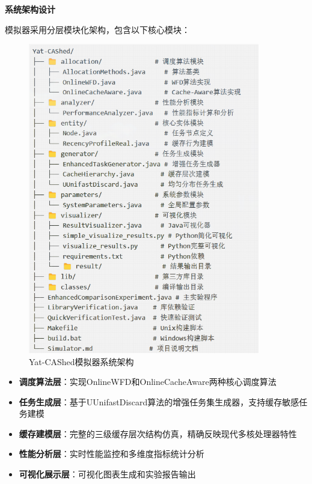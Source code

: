 \textbf{系统架构设计}

模拟器采用分层模块化架构，包含以下核心模块：

\begin{figure}[htbp]
\centering
\includegraphics[width=0.9\textwidth]{img/simulator_structure.png}
\caption{Yat-CAShed模拟器系统架构}
\label{fig:simulator_structure}
\end{figure}

\begin{itemize}
    \item \textbf{调度算法层}：实现OnlineWFD和OnlineCacheAware两种核心调度算法
    \item \textbf{任务生成层}：基于UUnifastDiscard算法的增强任务集生成器，支持缓存敏感任务建模
    \item \textbf{缓存建模层}：完整的三级缓存层次结构仿真，精确反映现代多核处理器特性
    \item \textbf{性能分析层}：实时性能监控和多维度指标统计分析
    \item \textbf{可视化展示层}：可视化图表生成和实验报告输出
\end{itemize}

